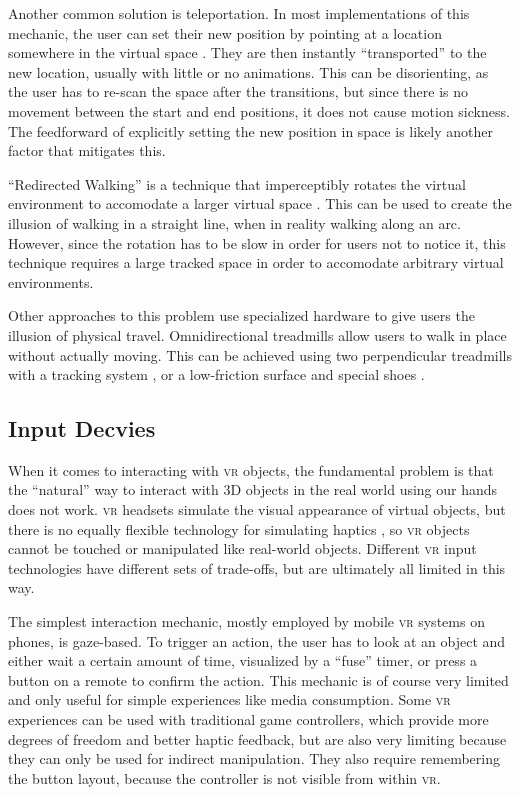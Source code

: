 \documentclass[nobib]{tufte-book} %
\begin{document}
Another common solution is teleportation. In most implementations of this mechanic, the user can set their new position by pointing at a location somewhere in the virtual space \cite{bozgeyikli2016point}. They are then instantly ``transported'' to the new location, usually with little or no animations. This can be disorienting, as the user has to re-scan the space after the transitions, but since there is no movement between the start and end positions, it does not cause motion sickness. The feedforward of explicitly setting the new position in space is likely another factor that mitigates this.

``Redirected Walking'' is a technique that imperceptibly rotates the virtual environment to accomodate a larger virtual space \cite{razzaque2001redirected}. This can be used to create the illusion of walking in a straight line, when in reality walking along an arc. However, since the rotation has to be slow in order for users not to notice it, this technique requires a large tracked space in order to accomodate arbitrary virtual environments.

Other approaches to this problem use specialized hardware to give users the illusion of physical travel. Omnidirectional treadmills allow users to walk in place without actually moving. This can be achieved using two perpendicular treadmills with a tracking system \cite{darken1997omni}, or a low-friction surface and special shoes \cite{warren2017omni}.

\subsection{Input Decvies}
When it comes to interacting with \textsc{vr} objects, the fundamental problem is that the ``natural'' way to interact with 3D objects in the real world using our hands does not work. \textsc{vr} headsets simulate the visual appearance of virtual objects, but there is no equally flexible technology for simulating haptics \cite{burdea1999keynote}, so \textsc{vr} objects cannot be touched or manipulated like real-world objects. Different \textsc{vr} input technologies have different sets of trade-offs, but are ultimately all limited in this way.

The simplest interaction mechanic, mostly employed by mobile \textsc{vr} systems on phones, is gaze-based. To trigger an action, the user has to look at an object and either wait a certain amount of time, visualized by a ``fuse'' timer, or press a button on a remote to confirm the action. This mechanic is of course very limited and only useful for simple experiences like media consumption. Some \textsc{vr} experiences can be used with traditional game controllers, which provide more degrees of freedom and better haptic feedback, but are also very limiting because they can only be used for indirect manipulation. They also require remembering the button layout, because the controller is not visible from within \textsc{vr}.
\end{document}
